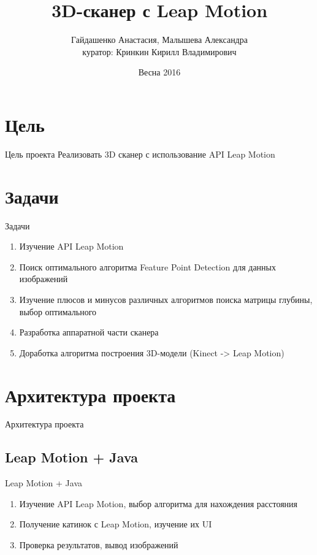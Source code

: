 \documentclass{beamer}
\title[3D сканер]{3D-сканер с Leap Motion}
\author{Гайдашенко Анастасия, Малышева Александра\\куратор: Кринкин Кирилл Владимирович}
\institute{СПб АУ РАН}
\date{Весна 2016}
\newcommand{\cimg}[2]{%
	\begin{center}%
		\ifthenelse{\equal{#2}{}}{%
			\texttt{[image: \#1]}
		}{%
			\texttt{[image: \#1]}
		}%
	\end{center}%
}
\begin{document}
\begin{frame}
	\titlepage
\end{frame}

\section{Цель}

\begin{frame}[t]{Цель проекта}
	Реализовать 3D сканер с использование API Leap Motion
	
	\cimg{01.png}{0.45}

\end{frame}

\section{Задачи}
\begin{frame}[t]{Задачи}
	\begin{enumerate}
		\item Изучение API Leap Motion
		\item Поиск оптимального алгоритма Feature Point Detection для данных изображений
		\item Изучение плюсов и минусов различных алгоритмов  поиска матрицы глубины, выбор оптимального
		\item Разработка аппаратной части сканера
		\item Доработка алгоритма построения 3D-модели (Kinect -> Leap Motion)
	\end{enumerate}
\end{frame}

\section{Архитектура проекта}
\begin{frame}[t]{Архитектура проекта}
	\cimg{02.png}{0.7}
\end{frame}

\subsection{Leap Motion + Java}
\begin{frame}[t]{Leap Motion + Java}
	\begin{enumerate}
		\item Изучение API Leap Motion, выбор алгоритма для нахождения расстояния
		\item Получение катинок с Leap Motion, изучение их UI
		\item Проверка результатов, вывод изображений
	\end{enumerate}
\end{frame}
\end{document}
